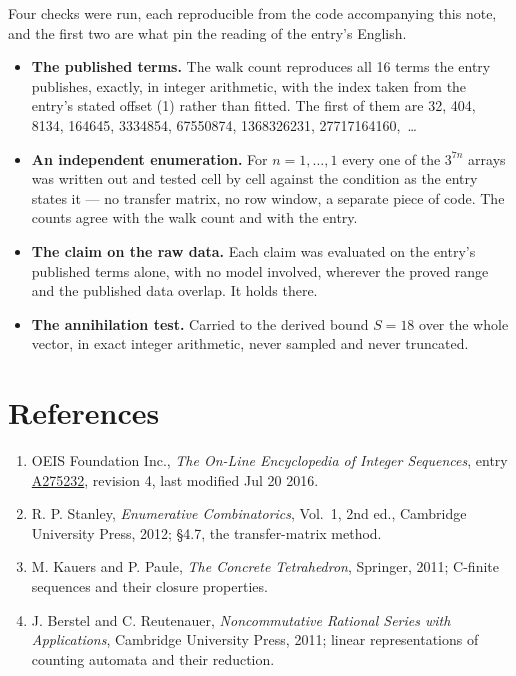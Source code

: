 \documentclass[11pt]{article}
\theoremstyle{definition}
\begin{document}
Four checks were run, each reproducible from the code accompanying this note, and the first two are what pin the reading of the entry's English.

\begin{itemize}

\item {\bfseries The published terms.} The walk count reproduces all 16 terms the entry publishes, exactly, in integer arithmetic, with the index taken from the entry's stated offset (1) rather than fitted. The first of them are 32, 404, 8134, 164645, 3334854, 67550874, 1368326231, 27717164160,~\dots

\item {\bfseries An independent enumeration.} For $n = 1,\dots,1$ every one of the $3^{7n}$ arrays was written out and tested cell by cell against the condition as the entry states it --- no transfer matrix, no row window, a separate piece of code. The counts agree with the walk count and with the entry.

\item {\bfseries The claim on the raw data.} Each claim was evaluated on the entry's published terms alone, with no model involved, wherever the proved range and the published data overlap. It holds there.

\item {\bfseries The annihilation test.} Carried to the derived bound $S = 18$ over the whole vector, in exact integer arithmetic, never sampled and never truncated.

\end{itemize}

\section{References}

\begin{enumerate}

\item OEIS Foundation Inc., \emph{The On-Line Encyclopedia of Integer Sequences}, entry \href{https://oeis.org/A275232}{A275232}, revision 4, last modified Jul 20 2016.

\item R. P. Stanley, \emph{Enumerative Combinatorics}, Vol.~1, 2nd ed., Cambridge University Press, 2012; \S4.7, the transfer-matrix method.

\item M. Kauers and P. Paule, \emph{The Concrete Tetrahedron}, Springer, 2011; C-finite sequences and their closure properties.

\item J. Berstel and C. Reutenauer, \emph{Noncommutative Rational Series with Applications}, Cambridge University Press, 2011; linear representations of counting automata and their reduction.

\end{enumerate}
\end{document}
